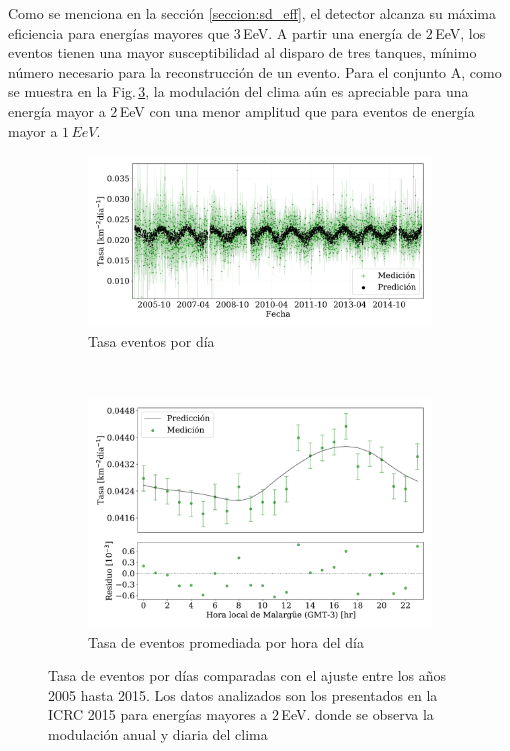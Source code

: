         Como se menciona en la sección \ref{seccion:sd_eff}, el detector alcanza su máxima eficiencia para energías mayores que 3\,EeV. A partir una energía de $2\,$EeV, los eventos tienen una mayor susceptibilidad al disparo de tres tanques, mínimo número necesario para la reconstrucción de un evento. Para el conjunto A, como se muestra en la Fig.\,\ref{fig:rate_2015_05-15_2EeV}, la modulación del clima aún es apreciable para una energía mayor a $2\,$EeV con una menor amplitud que para eventos de energía mayor a $1\,EeV$. 

        \begin{figure}[H]
            \centering
            \begin{subfigure}[b]{0.9\textwidth}
            \includegraphics[width=\textwidth]{Graphs/rate_dayly/herald_old_above_2EeV_rate_day.pdf}
            \caption{Tasa eventos por día}\label{fig:rate_dayly_ICRC_2015_2EeV}
            \end{subfigure}\\
            \begin{subfigure}[b]{0.9\textwidth}
            \includegraphics[width=\textwidth]{Graphs/rate_hour_of_the_day/herald_old_above_2EeV_hour_of_the_day.pdf}
            \caption{Tasa de eventos promediada por hora del día }\label{fig:rate_hod_ICRC_2015_2EeV}
            \end{subfigure}%
            \caption{Tasa de eventos por días comparadas con el ajuste entre los años 2005 hasta 2015. Los datos analizados son los presentados en la ICRC 2015 para energías mayores a $2\,$EeV. donde se observa la modulación anual y diaria del clima }\label{fig:rate_2015_05-15_2EeV}
        \end{figure}

